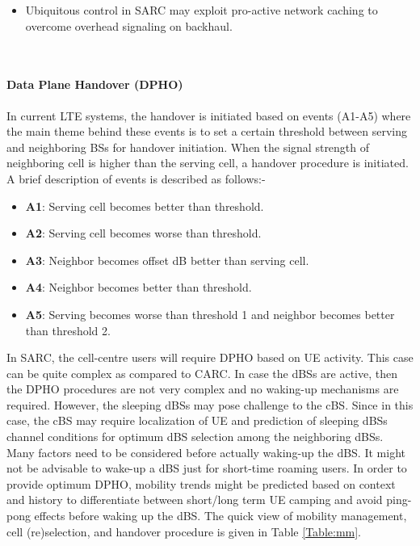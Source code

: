 \documentclass[article,10pt,twocolumn]{IEEEtran}
\begin{document}
\begin{table*}[!htb]
\begin{tcolorbox}[tab3,tabularx={>{\raggedright\arraybackslash}p{0.6in}||>{\raggedright\arraybackslash}p{1.3in}||X||X}]
\begin{itemize}[leftmargin=1.25em]
      																																										\item Ubiquitous control in SARC may exploit pro-active network caching to overcome overhead signaling on backhaul.
																																										\vspace*{-\baselineskip}
																																									\end{itemize}						\\  
\end{tcolorbox}
\vspace{-0.5mm}
\end{table*}
\paragraph{Data Plane Handover (DPHO)}
In current LTE systems, the handover is initiated based on events (A1-A5) where the main theme behind these events is to set a certain threshold between serving and neighboring BSs for handover initiation. When the signal strength of neighboring cell is higher than the serving cell, a handover procedure is initiated. A brief description of events \citep{3gpp.36.331} is described as follows:-

\begin{itemize}
  \item \textbf{A1}:    Serving cell becomes better than threshold.
  \item \textbf{A2}:    Serving cell becomes worse than threshold.
  \item \textbf{A3}:    Neighbor becomes offset dB better than serving cell.
  \item \textbf{A4}:    Neighbor becomes better than threshold.
  \item \textbf{A5}:    Serving becomes worse than threshold 1 and neighbor becomes better than threshold 2.
\end{itemize}

In SARC, the cell-centre users will require DPHO based on UE activity. This case can be quite complex as compared to CARC. In case the dBSs are active, then the DPHO procedures are not very complex and no waking-up mechanisms are required. However, the sleeping dBSs may pose challenge to the cBS. Since in this case, the cBS may require localization of UE and prediction of sleeping dBSs channel conditions for optimum dBS selection among the neighboring dBSs. Many factors need to be considered before actually waking-up the dBS. It might not be advisable to wake-up a dBS just for short-time roaming users. In order to provide optimum DPHO, mobility trends might be predicted based on context and history to differentiate between short/long term UE camping and avoid ping-pong effects before waking up the dBS. The quick view of mobility management, cell (re)selection, and handover procedure is given in Table \ref{Table:mm}.
\end{document}
